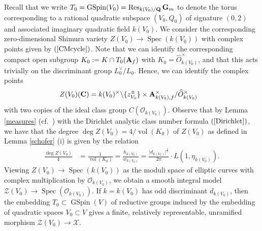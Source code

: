 \documentclass{amsart}
\theoremstyle{definition}
\theoremstyle{definition}
\theoremstyle{definition}
\begin{document}
Recall that we write $T_0 = \operatorname{GSpin}(V_0) = \operatorname{Res}_{k(V_0)/{\bf{Q}}} {\bf{G}}_m$ to denote the 
torus corresponding to a rational quadratic subspace $(V_0, Q_0)$ of signature $(0, 2)$ and associated imaginary quadratic field $k(V_0)$. 
We consider the corresponding zero-dimensional Shimura variety $Z(V_0) \longrightarrow \operatorname{Spec}(k(V_0))$ with complex points 
given by $(\ref{CMcycle})$. 
Note that we can identify the corresponding compact open subgroup $K_0:= K \cap T_0({\bf{A}}_f)$ with $K_0 =\widehat{O}_{k(V_0)}^{\times}$, 
and that this acts trivially on the discriminant group $L_0^{\vee}/L_0$. Hence, we can identify the complex points
\begin{align*} Z(V_0)({\bf{C}}) 
&= k(V_0)^{\times} \backslash \lbrace z_{V_0}^{\pm} \rbrace  \times {\bf{A}}_{k(V_0), f}^{\times} / \widehat{O}_{k(V_0)}^{\times} \end{align*}
with two copies of the ideal class group $C(\mathcal{O}_{k(V_0)})$. Observe that by Lemma \ref{measures} (cf.~\cite[Lemma 6.3]{BY}) 
with the Dirichlet analytic class number formula $(\ref{Dirichlet})$, we have that the degree $\operatorname{deg} Z(V_0) = 4/\operatorname{vol}(K_0)$
of $Z(V_0)$ as defined in Lemma \ref{schofer} (i)  is given by the relation 
\begin{align*} \frac{ \operatorname{deg} Z(V_0) }{4} 
&= \frac{1}{ \operatorname{vol}(K_0)} = \frac{h_{k(V_0)}}{w_{k(V_0)}} = \frac{ \vert d_{k(V_0)} \vert^{\frac{1}{2}} }{ 2 \pi} \cdot L(1, \eta_{k(V_0)}).\end{align*}
Viewing $Z(V_0) \rightarrow \operatorname{Spec}(k(V_0))$ as the moduli space of elliptic curves with complex
multiplication by $\mathcal{O}_{k(V_0)}$, we obtain a smooth integral model $\mathcal{Z}(V_0) \rightarrow \operatorname{Spec}(\mathcal{O}_{k(V_0)})$.
If $k = k(V_0)$ has odd discriminant $d_{k(V_0)}$, then the embedding 
$T_0 \subset \operatorname{GSpin}(V)$ of reductive groups induced by the embedding of quadratic spaces 
$V_0 \subset V$ gives a finite, relatively representable, unramified morphism $\mathcal{Z}(V_0) \longrightarrow \mathcal{X}$.
\end{document}
